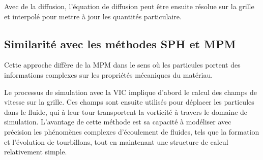 Avec de la diffusion, l'équation de diffusion peut être ensuite résolue sur la grille et interpolé pour mettre à jour les quantités particulaire.

\subsection{Similarité avec les méthodes SPH et MPM}
Cette approche diffère de la MPM dans le sens où les particules portent des informations complexes sur les propriétés mécaniques du matériau.

Le processus de simulation avec la VIC implique d'abord le calcul des champs de vitesse sur la grille. Ces champs sont ensuite utilisés pour déplacer les particules dans le fluide, qui à leur tour transportent la vorticité à travers le domaine de simulation. L'avantage de cette méthode est sa capacité à modéliser avec précision les phénomènes complexes d'écoulement de fluides, tels que la formation et l'évolution de tourbillons, tout en maintenant une structure de calcul relativement simple.

